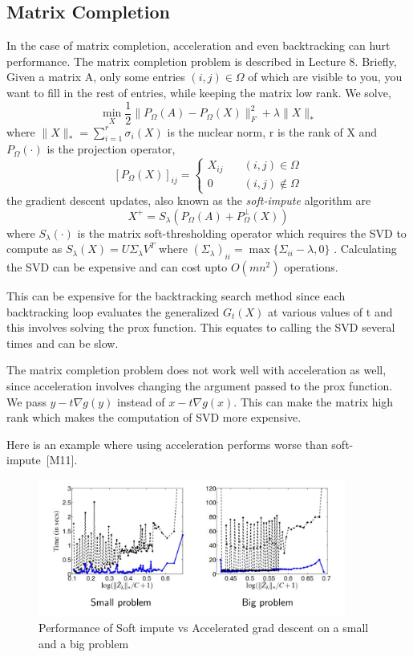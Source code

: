 \documentclass[twoside]{article}
\renewcommand{\cite}[1]{[#1]}
\begin{document}
\subsection{Matrix Completion}
In the case of matrix completion, acceleration and even backtracking can hurt performance. The matrix completion problem is described in Lecture 8. Briefly, Given a matrix A, only some entries $(i,j) \in \Omega$ of which are visible to you, you want to   fill in the rest of entries, while keeping the matrix low rank. We solve, 
\[
\min_{X}\frac{1}{2}\lVert P_\Omega(A) - P_\Omega(X) \rVert_F^2 + \lambda\lVert X \rVert_*
\]
 where $\lVert X \rVert_* = \sum_{i=1}^r \sigma_i(X)$ is the nuclear norm, r is the rank of X and $P_\Omega(\cdot)$ is the projection operator,
 \[
 \left[P_\Omega(X) \right]_{ij} = \begin{cases}
 X_{ij} &\quad (i,j) \in \Omega \\
 0 &\quad (i,j) \notin \Omega
 \end{cases}
 \]
the gradient descent updates, also known as the \emph{soft-impute} algorithm are 
\[
X^+ = S_\lambda(P_\Omega(A) + P_\Omega^\perp(X))
\]
where $S_\lambda(\cdot)$ is the matrix soft-thresholding operator which requires the SVD to compute as $S_\lambda(X) = U\Sigma_\lambda V^T$ where $(\Sigma_\lambda)_{ii}=\max\{\Sigma_{ii}-\lambda,0\}$ . Calculating the SVD can be expensive and can cost upto $O(mn^2)$ operations. 


This can be expensive for the backtracking search method since each backtracking loop evaluates the generalized $G_t(X)$ at various values of t and this involves solving the prox function. This equates to calling the SVD several times and can be slow. 


The matrix completion problem does not work well with acceleration as well, since acceleration involves changing the argument passed to the prox function. We pass $y-t\nabla g(y)$ instead of $x - t\nabla g(x)$. This can make the matrix high rank which makes the computation of SVD more expensive. 


Here is an example where using acceleration performs worse than soft-impute~\cite{M11}. 

\begin{figure}[ht!]
\centering
\includegraphics[width=0.9\textwidth]{scribe3.png}
\caption{Performance of Soft impute vs Accelerated grad descent on a small and a big problem}
\end{figure}
\end{document}

